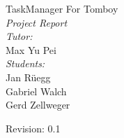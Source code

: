 \begin{titlepage}
\mbox{}
\vfill
\begin{center}
{\huge  TaskManager For Tomboy\\ \smallskip}
{\LARGE  {\em Project Report}\\}
\bigskip
\bigskip
{\Large {\em Tutor:\\}} {\large{Max Yu Pei\\}}
\bigskip
\bigskip
{\Large {\em Students:\\}} {\large Jan Rüegg\\ Gabriel Walch\\ Gerd Zellweger\\}

\bigskip
\bigskip
{\large Revision: 0.1}
\end{center}
\vfill
\end{titlepage}

\begin{titlepage}
\newpage
\tableofcontents
\newpage
\end{titlepage}
